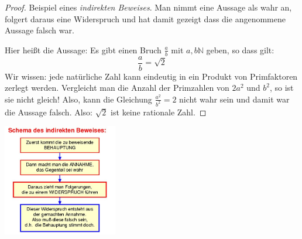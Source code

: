 \documentclass[a4paper, twoside, parskip, 10pt, smallheadings]{scrbook}
\theoremstyle{plain}
\theoremstyle{definition}
\begin{document}
\begin{minipage}{10cm}
\begin{proof}Beispiel eines {\it indirekten Beweises}. Man nimmt eine Aussage als wahr an, folgert daraus eine Widerspruch und hat damit gezeigt dass die angenommene Aussage falsch war.

Hier heißt die Aussage: Es gibt einen Bruch $\frac{a}{b}$ mit $a, b \mathbb{N}$ geben, so dass gilt:  $$\frac{a}{b}=\sqrt{2}$$
Wir wissen: jede natürliche Zahl kann eindeutig in ein Produkt von Primfaktoren zerlegt werden. Vergleicht man die Anzahl der Primzahlen von $2a^2$ und $b^2$, so ist sie nicht gleich! Also, kann die Gleichung $\frac{a^2}{b^2}=2$ nicht wahr sein und damit war die Aussage falsch. Also: $\sqrt{2}$ ist keine rationale Zahl. 
\end{proof}
\end{minipage}
\begin{minipage}{5cm}
	\begin{center}
	\includegraphics[width=5cm,bb=0 0 501 489]{2te/reellezahlen/bilder/indirekterbeweis.jpg}
	\end{center}
\end{minipage}
\end{document}
